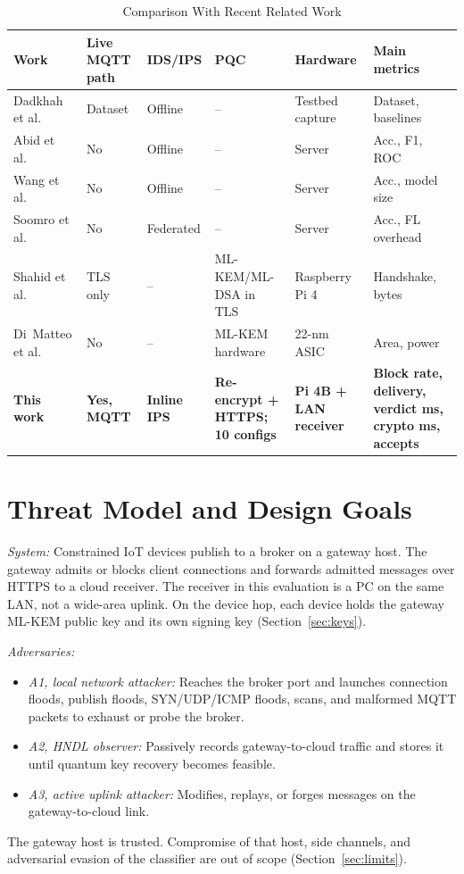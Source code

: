 \documentclass[journal]{IEEEtran}
\begin{document}
\begin{table}[!t]
\centering
\caption{Comparison With Recent Related Work}
\label{tab:related}
\footnotesize
\begin{tabular}{p{2.8cm}p{2.0cm}p{1.6cm}p{2.8cm}p{2.2cm}p{4.0cm}}
\toprule
\textbf{Work} & \textbf{Live MQTT path} & \textbf{IDS/IPS} & \textbf{PQC} & \textbf{Hardware} & \textbf{Main metrics} \\
\midrule
Dadkhah et al.~\cite{ciciomt2024} & Dataset & Offline & -- & Testbed capture & Dataset, baselines \\
Abid et al.~\cite{abid2025gwo} & No & Offline & -- & Server & Acc., F1, ROC \\
Wang et al.~\cite{wang2025skd} & No & Offline & -- & Server & Acc., model size \\
Soomro et al.~\cite{soomro2025roche} & No & Federated & -- & Server & Acc., FL overhead \\
Shahid et al.~\cite{shahid2026pqtls} & TLS only & -- & ML-KEM/ML-DSA in TLS & Raspberry Pi 4 & Handshake, bytes \\
Di~Matteo et al.~\cite{dimatteo2026kem22} & No & -- & ML-KEM hardware & 22-nm ASIC & Area, power \\
\midrule
\textbf{This work} & \textbf{Yes, MQTT} & \textbf{Inline IPS} & \textbf{Re-encrypt + HTTPS; 10 configs} & \textbf{Pi 4B + LAN receiver} & \textbf{Block rate, delivery, verdict ms, crypto ms, accepts} \\
\bottomrule
\end{tabular}
\end{table}

\section{Threat Model and Design Goals}
\label{sec:threat}

\textit{System:} Constrained IoT devices publish to a broker on a gateway host. The gateway admits or blocks client connections and forwards admitted messages over HTTPS to a cloud receiver. The receiver in this evaluation is a PC on the same LAN, not a wide-area uplink. On the device hop, each device holds the gateway ML-KEM public key and its own signing key (Section~\ref{sec:keys}).

\textit{Adversaries:}
\begin{itemize}
  \item \textit{A1, local network attacker:} Reaches the broker port and launches connection floods, publish floods, SYN/UDP/ICMP floods, scans, and malformed MQTT packets to exhaust or probe the broker.
  \item \textit{A2, HNDL observer:} Passively records gateway-to-cloud traffic and stores it until quantum key recovery becomes feasible.
  \item \textit{A3, active uplink attacker:} Modifies, replays, or forges messages on the gateway-to-cloud link.
\end{itemize}
The gateway host is trusted. Compromise of that host, side channels, and adversarial evasion of the classifier are out of scope (Section~\ref{sec:limits}).
\end{document}
